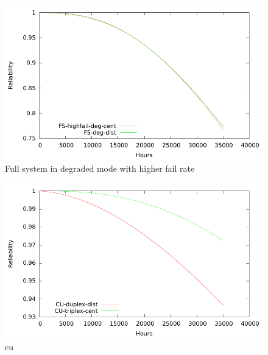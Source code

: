 \begin{figure}[H]
  \centering
  \includegraphics{plots/FS-hf.pdf}
  \caption{Full system in degraded mode with higher fail rate}
  \label{fig:cfs_hf}
\end{figure}
\begin{figure}[H]
  \centering
  \includegraphics{plots/CUs.pdf}
  \caption{cu}
  \label{fig:cu}
\end{figure}